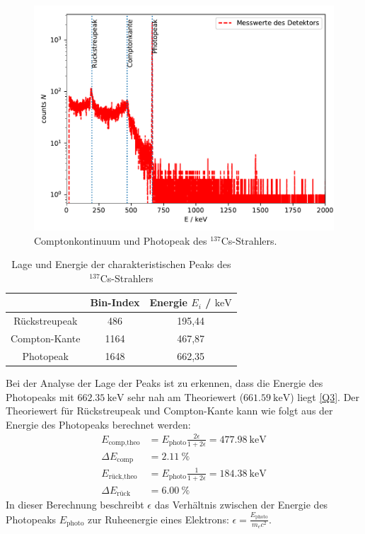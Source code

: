 \FloatBarrier
\begin{figure}
    \centering
    \includegraphics[scale=0.7]{Cs_fit.pdf}
    \caption{Comptonkontinuum und Photopeak des $^{137}$Cs-Strahlers.}
    \label{abb:Cs_peaks}
\end{figure}
\FloatBarrier

\begin{table}
    \centering
    \caption{Lage und Energie der charakteristischen Peaks des $^{137}$Cs-Strahlers}
    \label{tab:Cs_peaks}
    \begin{tabular}{ c c c }
        \toprule
        & {Bin-Index} & {Energie $E_i$ / $\si{\kilo \electronvolt}$  }      \\
        \midrule
        {Rückstreupeak} & 486  & 195,44      \\
        {Compton-Kante} & 1164 & 467,87      \\
        {Photopeak}     & 1648 & 662,35      \\
        \bottomrule
    \end{tabular}
\end{table}
\FloatBarrier
Bei der Analyse der Lage der Peaks ist zu erkennen, dass die Energie des Photopeaks mit $\SI{662,35}{\kilo \electronvolt}$ sehr nah am Theoriewert ($\SI{661,59}{\kilo \electronvolt}$) liegt \ref{Q3}.
Der Theoriewert für Rückstreupeak und Compton-Kante kann wie folgt aus der Energie des Photopeaks berechnet werden:
\begin{align*}
    E_{\text{comp,theo}} &= E_\text{photo} \frac{2\epsilon}{1+2\epsilon} = \SI{477,98}{\kilo\electronvolt} \\ \Delta E_\text{comp} &= \SI{2,11}{\percent} \\
    E_{\text{rück,theo}} &= E_\text{photo} \frac{1}{1+2\epsilon} = \SI{184,38}{\kilo\electronvolt} \\
    \Delta E_\text{rück} &= \SI{6,00}{\percent}
\end{align*}
In dieser Berechnung beschreibt $\epsilon$ das Verhältnis zwischen der Energie des Photopeaks $E_\text{photo}$ zur Ruheenergie eines Elektrons: $\epsilon = \frac{E_\text{photo}}{m_e c^2}$.

